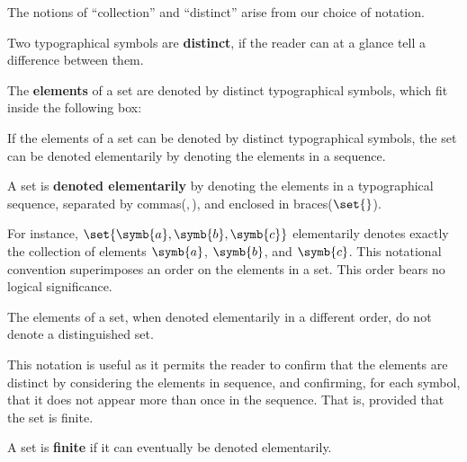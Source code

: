 The notions of ``collection'' and ``distinct'' arise from our choice of
notation.

\begin{notation}

Two typographical symbols are \textbf{distinct}, if the reader can at a glance
tell a difference between them.

\end{notation}

\begin{notation}

The \textbf{elements} of a set are denoted by distinct typographical symbols,
which fit inside the following box:

\begin{center}
\end{center}

\end{notation}

If the elements of a set can be denoted by distinct typographical symbols, the
set can be denoted elementarily by denoting the elements in a sequence. 

\begin{notation}

A set is \textbf{denoted elementarily} by denoting the elements in a
typographical sequence, separated by commas($,$), and enclosed in
braces($\set{}$).

\end{notation}

For instance, $\set{\symb{a},\symb{b},\symb{c}}$ elementarily denotes exactly
the collection of elements $\symb{a}$, $\symb{b}$, and $\symb{c}$.  This
notational convention superimposes an order on the elements in a set. This
order bears no logical significance.

\begin{notational-corollary}

The elements of a set, when denoted elementarily in a different order, do not
denote a distinguished set.

\end{notational-corollary}

This notation is useful as it permits the reader to confirm that the elements
are distinct by considering the elements in sequence, and confirming, for each
symbol, that it does not appear more than once in the sequence. That is,
provided that the set is finite.

\begin{notion}

A set is \textbf{finite} if it can eventually be denoted elementarily.

\end{notion}

